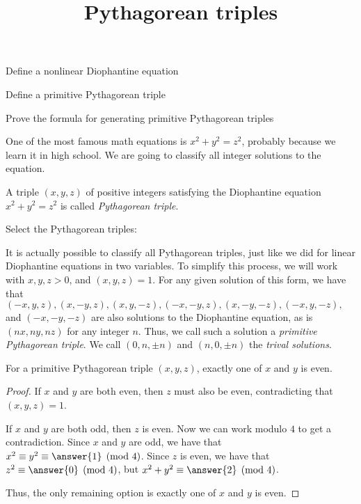 \documentclass{ximera}
\title{Pythagorean triples}
\begin{document}
\begin{abstract}
\end{abstract}
\maketitle

\begin{obj}
    \item Define a nonlinear Diophantine equation
    \item Define a primitive Pythagorean triple
	\item Prove the formula for generating primitive Pythagorean triples
\end{obj}

One of the most famous math equations is $x^2+y^2=z^2$, probably because we learn it in high school. We are going to classify all integer solutions to the equation.
 
\begin{definition}
	A triple $(x,y,z)$ of positive integers satisfying the Diophantine equation $x^2+y^2=z^2$ is called \emph{Pythagorean triple}.
\end{definition}
 

\begin{onlineOnly}
	Select the Pythagorean triples:
  
	\begin{selectAll}
	\end{selectAll}
\end{onlineOnly}

 
It is actually possible to classify all Pythagorean triples, just like we did for linear Diophantine equations in two variables. To simplify this process, we will work with $x,y,z>0$, and $(x,y,z)=1$. For any given solution of this form, we have that $(-x,y,z),(x,-y,z),(x,y,-z),(-x,-y,z),(x,-y,-z),(-x,y,-z),$ and $(-x,-y,-z)$ are also solutions to the Diophantine equation, as is $(nx,ny,nz)$ for any integer $n$. Thus, we call such a solution a \emph{primitive Pythagorean triple}.  We call $(0,n,\pm n)$ and $(n,0,\pm n)$ the \emph{trival solutions}.
 
\begin{theorem}
For a primitive Pythagorean triple $(x,y,z)$, exactly one of $x$ and $y$ is even.
\end{theorem}
\begin{proof}
 If $x$ and $y$ are both even, then $z$ must also be even, contradicting that $(x,y,z)=1$.
  
 If $x$ and $y$ are both odd, then $z$ is even. Now we can work modulo $4$ to get a contradiction. Since $x$ and $y$ are odd, we have that $x^2\equiv y^2\equiv \answer{1}\pmod 4$. Since $z$ is even, we have that $z^2\equiv \answer{0}\pmod 4$, but $x^2+y^2\equiv \answer{2}\pmod 4$.
  
 Thus, the only remaining option is exactly one of $x$ and $y$ is even.
\end{proof}
\end{document}
